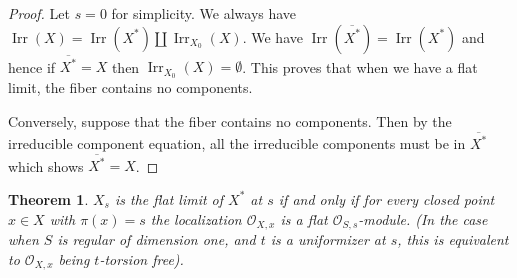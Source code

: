 \documentclass[12pt]{article}
\numberwithin{equation}{section}
\newtheorem{theorem}{Theorem}[subsection]
\theoremstyle{definition}
\theoremstyle{remark}
\newcommand{\Ocal}{\mathcal{O}}
\newcommand{\Irr}{\operatorname{Irr}}
\begin{document}
\begin{proof}
	Let $s=0$ for simplicity.
	We always have $\Irr(X) = \Irr(X^*) \amalg \Irr_{X_0}(X)$.
	We have $\Irr(\overline{X^*}) = \Irr(X^*)$ and hence if $\overline{X^*}=X$ then $\Irr_{X_0}(X)=\emptyset$.  
	This proves that when we have a flat limit, the fiber contains no components. 
	
	Conversely, suppose that the fiber contains no components. 
	Then by the irreducible component equation, all the irreducible components must be in $\overline{X^*}$ which shows $\overline{X^*}=X$.
\end{proof}


\begin{theorem}
	$X_s$ is the flat limit of $X^*$ at $s$ if and only if for every closed point $x \in X$ with $\pi(x)=s$ the localization $\Ocal_{X,x}$ is a flat $\Ocal_{S,s}$-module. (In the case when $S$ is regular of dimension one, and $t$ is a uniformizer at $s$, this is equivalent to $\Ocal_{X,x}$ being $t$-torsion free).
\end{theorem}
\end{document}
